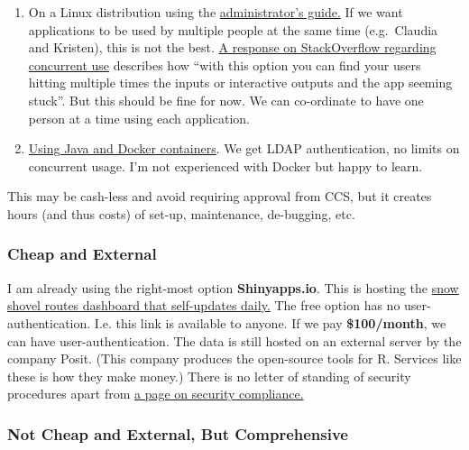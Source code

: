 \documentclass[
  letterpaper,
  DIV=11,
  numbers=noendperiod,
  oneside]{scrreprt}
\providecommand{\tightlist}{%
  \setlength{\itemsep}{0pt}\setlength{\parskip}{0pt}}\usepackage{longtable,booktabs,array}
\begin{document}
\begin{enumerate}
\def\labelenumi{\arabic{enumi}.}
\tightlist
\item
  On a Linux distribution using the
  \href{https://docs.posit.co/shiny-server/}{administrator's guide.} If
  we want applications to be used by multiple people at the same time
  (e.g.~Claudia and Kristen), this is not the best.
  \href{https://stackoverflow.com/questions/59169546/how-do-we-configure-shinyserver-open-source-to-support-concurrent-users}{A
  response on StackOverflow regarding concurrent use} describes how
  ``with this option you can find your users hitting multiple times the
  inputs or interactive outputs and the app seeming stuck''. But this
  should be fine for now. We can co-ordinate to have one person at a
  time using each application.
\item
  \href{https://www.shinyproxy.io/}{Using Java and Docker containers}.
  We get LDAP authentication, no limits on concurrent usage. I'm not
  experienced with Docker but happy to learn.
\end{enumerate}

This may be cash-less and avoid requiring approval from CCS, but it
creates hours (and thus costs) of set-up, maintenance, de-bugging, etc.

\hypertarget{cheap-and-external}{%
\subsubsection{Cheap and External}\label{cheap-and-external}}

I am already using the right-most option \textbf{Shinyapps.io}. This is
hosting the
\href{https://physical-resources.shinyapps.io/shovelapp/}{snow shovel
routes dashboard that self-updates daily.} The free option has no
user-authentication. I.e. this link is available to anyone. If we pay
\textbf{\$100/month}, we can have user-authentication. The data is still
hosted on an external server by the company Posit. (This company
produces the open-source tools for R. Services like these is how they
make money.) There is no letter of standing of security procedures apart
from
\href{https:/docs.posit.co/shinyapps.io/security-and-compliance.html}{a
page on security compliance.}

\hypertarget{not-cheap-and-external-but-comprehensive}{%
\subsubsection{Not Cheap and External, But
Comprehensive}\label{not-cheap-and-external-but-comprehensive}}
\end{document}
